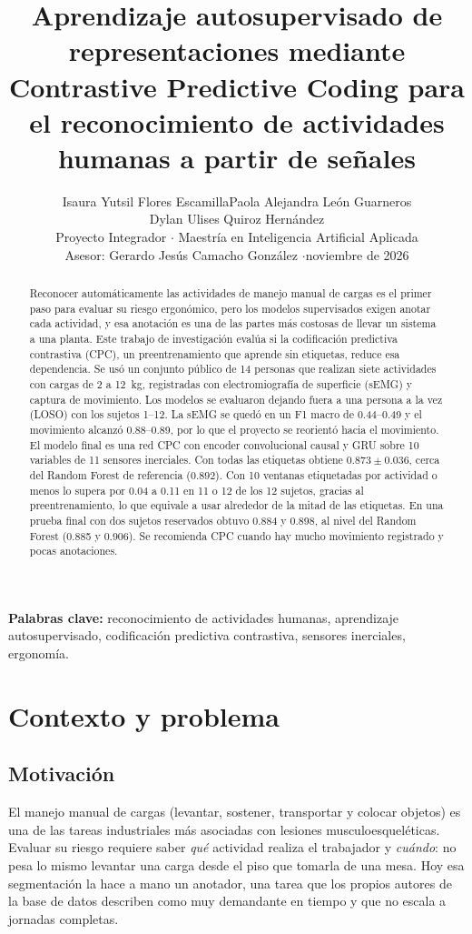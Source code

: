 \documentclass[letterpaper,11pt]{article}
\title{\textbf{Aprendizaje autosupervisado de representaciones mediante Contrastive Predictive Coding para el reconocimiento de actividades
humanas a partir de señales}}
\author{Isaura Yutsil Flores Escamilla\quad Paola Alejandra León Guarneros\\[2pt] Dylan Ulises Quiroz Hernández\\[6pt]
  \normalsize Proyecto Integrador $\cdot$ Maestría en Inteligencia Artificial Aplicada \\[6pt]
  \normalsize Asesor: Gerardo Jesús Camacho González \quad$\cdot$\quad noviembre de 2026}
\date{\vspace{-2ex}}
\begin{document}
\maketitle

\begin{abstract}
\noindent
Reconocer automáticamente las actividades de manejo manual de cargas es el primer paso para evaluar su riesgo ergonómico, pero los modelos supervisados exigen anotar cada actividad, y esa anotación es una de las partes más costosas de llevar un sistema a una planta. Este trabajo de investigación evalúa si la codificación predictiva contrastiva (CPC), un preentrenamiento que aprende sin etiquetas, reduce esa dependencia. Se usó un conjunto público de 14 personas que realizan siete actividades con cargas de 2 a 12~kg, registradas con electromiografía de superficie (sEMG) y captura de movimiento. Los modelos se evaluaron dejando fuera a una persona a la vez (LOSO) con los sujetos 1--12. La sEMG se quedó en un F1 macro de 0.44--0.49 y el movimiento alcanzó 0.88--0.89, por lo que el proyecto se reorientó hacia el movimiento. El modelo final es una red CPC con encoder convolucional causal y GRU sobre 10 variables de 11 sensores inerciales. Con todas las etiquetas obtiene $0.873 \pm 0.036$, cerca del Random Forest de referencia ($0.892$). Con 10 ventanas etiquetadas por actividad o menos lo supera por 0.04 a 0.11 en 11 o 12 de los 12 sujetos, gracias al preentrenamiento, lo que equivale a usar alrededor de la mitad de las etiquetas. En una prueba final con dos sujetos reservados obtuvo 0.884 y 0.898, al nivel del Random Forest (0.885 y 0.906). Se recomienda CPC cuando hay mucho movimiento registrado y pocas anotaciones.
\end{abstract}

\noindent\textbf{Palabras clave:} reconocimiento de actividades humanas, aprendizaje autosupervisado, codificación predictiva contrastiva, sensores inerciales, ergonomía.

\section{Contexto y problema}

\subsection{Motivación}
El manejo manual de cargas (levantar, sostener, transportar y colocar objetos) es una de las tareas industriales más asociadas con lesiones musculoesqueléticas. Evaluar su riesgo requiere saber \emph{qué} actividad realiza el trabajador y \emph{cuándo}: no pesa lo mismo levantar una carga desde el piso que tomarla de una mesa. Hoy esa segmentación la hace a mano un anotador, una tarea que los propios autores de la base de datos describen como muy demandante en tiempo \parencite{bassani2025} y que no escala a jornadas completas.
\end{document}
